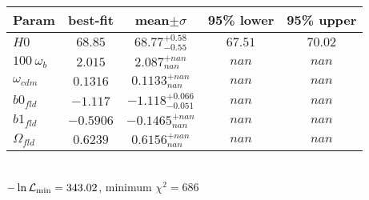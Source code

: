 \begin{tabular}{|l|c|c|c|c|} 
 \hline 
Param & best-fit & mean$\pm\sigma$ & 95\% lower & 95\% upper \\ \hline 
$H0$ &$68.85$ & $68.77_{-0.55}^{+0.58}$ & $67.51$ & $70.02$ \\ 
$100~\omega_{b }$ &$2.015$ & $2.087_{nan}^{+nan}$ & $nan$ & $nan$ \\ 
$\omega_{cdm }$ &$0.1316$ & $0.1133_{nan}^{+nan}$ & $nan$ & $nan$ \\ 
$b0_{fld }$ &$-1.117$ & $-1.118_{-0.051}^{+0.066}$ & $nan$ & $nan$ \\ 
$b1_{fld }$ &$-0.5906$ & $-0.1465_{nan}^{+nan}$ & $nan$ & $nan$ \\ 
$\Omega_{fld }$ &$0.6239$ & $0.6156_{nan}^{+nan}$ & $nan$ & $nan$ \\ 
\hline 
 \end{tabular} \\ 
$-\ln{\cal L}_\mathrm{min} =343.02$, minimum $\chi^2=686$ \\ 
